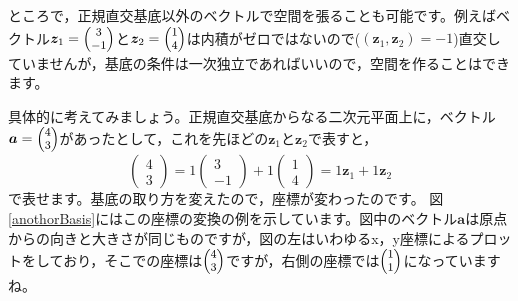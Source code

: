 \documentclass{ltjsbook}
\begin{document}
ところで，正規直交基底以外のベクトルで空間を張ることも可能です。例えばベクトル$\bm{z}_1 = \footnotesize\begin{pmatrix}3\\-1\end{pmatrix}$と$\bm{z}_2 = \footnotesize\begin{pmatrix}1\\4\end{pmatrix}$は内積がゼロではないので($(\bm{z}_1,\bm{z}_2) = -1$)直交していませんが，基底の条件は一次独立であればいいので，空間を作ることはできます。

具体的に考えてみましょう。正規直交基底からなる二次元平面上に，ベクトル$\bm{a}=\footnotesize\begin{pmatrix}4\\3\end{pmatrix}$があったとして，これを先ほどの$\bm{z}_1$と$\bm{z}_2$で表すと，
\[ \begin{pmatrix}4\\3\end{pmatrix} = 1\begin{pmatrix}3\\-1\end{pmatrix} + 1\begin{pmatrix}1\\4\end{pmatrix} = 1\bm{z}_1 + 1\bm{z}_2\]
で表せます。基底の取り方を変えたので，座標が変わったのです。
図\ref{anothorBasis}にはこの座標の変換の例を示しています。図中のベクトル$\bm{a}$は原点からの向きと大きさが同じものですが，図の左はいわゆるx，y座標によるプロットをしており，そこでの座標は$\footnotesize\begin{pmatrix}4\\3\end{pmatrix}$ですが，右側の座標では$\footnotesize\begin{pmatrix}1\\1\end{pmatrix}$になっていますね。
\end{document}

